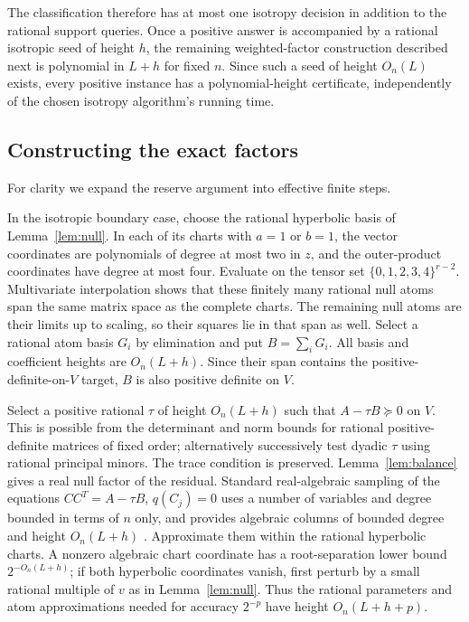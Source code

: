 The classification therefore has at most one isotropy decision in addition to the rational support queries. Once a positive answer is accompanied by a rational isotropic seed of height $h$, the remaining weighted-factor construction described next is polynomial in $L+h$ for fixed $n$. Since such a seed of height $O_n(L)$ exists, every positive instance has a polynomial-height certificate, independently of the chosen isotropy algorithm's running time.

\subsection{Constructing the exact factors}
For clarity we expand the reserve argument into effective finite steps.

In the isotropic boundary case, choose the rational hyperbolic basis of Lemma~\ref{lem:null}. In each of its charts with $a=1$ or $b=1$, the vector coordinates are polynomials of degree at most two in $z$, and the outer-product coordinates have degree at most four. Evaluate on the tensor set $\{0,1,2,3,4\}^{r-2}$. Multivariate interpolation shows that these finitely many rational null atoms span the same matrix space as the complete charts. The remaining null atoms are their limits up to scaling, so their squares lie in that span as well. Select a rational atom basis $G_i$ by elimination and put $B=\sum_iG_i$. All basis and coefficient heights are $O_n(L+h)$. Since their span contains the positive-definite-on-$V$ target, $B$ is also positive definite on $V$.

Select a positive rational $\tau$ of height $O_n(L+h)$ such that $A-\tau B\succeq0$ on $V$. This is possible from the determinant and norm bounds for rational positive-definite matrices of fixed order; alternatively successively test dyadic $\tau$ using rational principal minors. The trace condition is preserved. Lemma~\ref{lem:balance} gives a real null factor of the residual. Standard real-algebraic sampling of the equations $CC^T=A-\tau B$, $q(C_j)=0$ uses a number of variables and degree bounded in terms of $n$ only, and provides algebraic columns of bounded degree and height $O_n(L+h)$ \cite{SEDZ}. Approximate them within the rational hyperbolic charts. A nonzero algebraic chart coordinate has a root-separation lower bound $2^{-O_n(L+h)}$; if both hyperbolic coordinates vanish, first perturb by a small rational multiple of $v$ as in Lemma~\ref{lem:null}. Thus the rational parameters and atom approximations needed for accuracy $2^{-p}$ have height $O_n(L+h+p)$.

